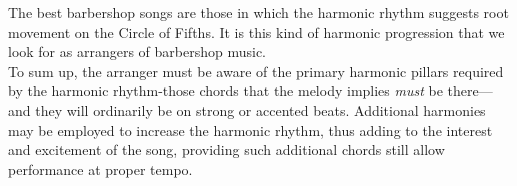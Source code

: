 \documentclass{article} %
\numberwithin{equation}{section} %
\begin{document}
		The best barbershop songs are those in which the harmonic rhythm suggests root movement on the Circle of Fifths. It is this kind of harmonic progression that we look for as arrangers of barbershop music. \\

		To sum up, the arranger must be aware of the primary harmonic pillars required by the harmonic rhythm-those chords that the melody implies \textit{must} be there---and they will ordinarily be on strong or accented beats. Additional harmonies may be employed to increase the harmonic rhythm, thus adding to the interest and excitement of the song, providing such additional chords still allow performance at proper tempo.\\
\end{document}
